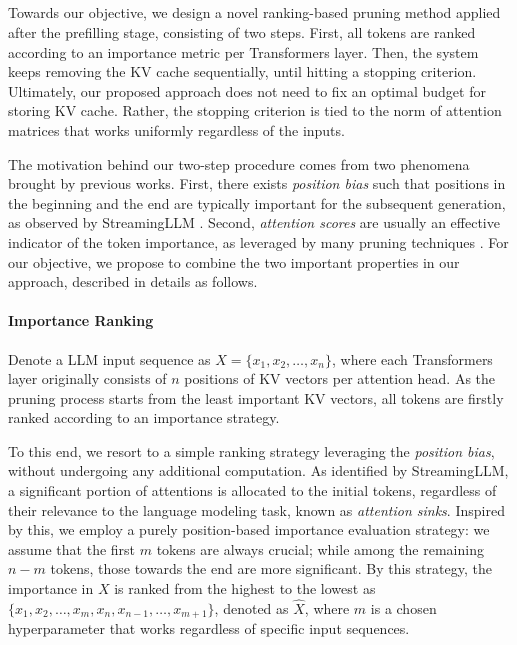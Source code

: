 \subsection{\method}
\label{ssec:method}

Towards our objective, we design a novel ranking-based pruning method applied after the prefilling stage, consisting of two steps. First, all tokens are ranked according to an importance metric per Transformers layer. Then, the system keeps removing the KV cache sequentially, until hitting a stopping criterion.
Ultimately, our proposed approach does not need to fix an optimal budget for storing KV cache. Rather, the stopping criterion is tied to the norm of attention matrices that works uniformly regardless of the inputs.

The motivation behind our two-step procedure comes from two phenomena brought by previous works.
First, there exists \emph{position bias} such that positions in the beginning and the end are typically important for the subsequent generation, as observed by StreamingLLM \cite{DBLP:conf/iclr/XiaoTCHL24}. Second, \emph{attention scores} are usually an effective indicator of the token importance, as leveraged by many pruning techniques \cite{DBLP:conf/nips/LiuDLWXXKS23,DBLP:conf/nips/Zhang00CZC0TRBW23,DBLP:conf/nips/LiHYVLYCLC24}. For our objective, we propose to combine the two important properties in our approach, described in details as follows.

\paragraph{Importance Ranking}
Denote a LLM input sequence as $X=\{x_1,x_2,\dots,x_n\}$, where each Transformers layer originally consists of $n$ positions of KV vectors per attention head.
As the pruning process starts from the least important KV vectors, all tokens are firstly ranked according to an importance strategy.

To this end, we resort to a simple ranking strategy leveraging the \emph{position bias}, without undergoing any additional computation.
As identified by StreamingLLM, a significant portion of attentions is allocated to the initial tokens, regardless of their relevance to the language modeling task, known as \emph{attention sinks}. Inspired by this, we employ a purely position-based importance evaluation strategy:
we assume that the first $m$ tokens are always crucial; while among the remaining $n - m$ tokens, those towards the end are more significant. By this strategy, the importance in $X$ is ranked from the highest to the lowest as  $\{x_1,x_2,\dots,x_m, x_n,x_{n-1},\dots,x_{m+1}\}$, denoted as $\widehat{X}$, where $m$ is a chosen hyperparameter that works regardless of specific input sequences.

